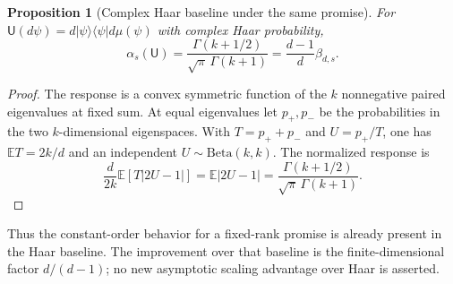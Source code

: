 \documentclass[11pt]{article}
\newtheorem{proposition}{Proposition}
\begin{document}
\begin{proposition}[Complex Haar baseline under the same promise]
For $\mathsf U(d\psi)=d|\psi\rangle\langle\psi|d\mu(\psi)$
with complex Haar probability,
\[
\alpha_s(\mathsf U)
=\frac{\Gamma(k+1/2)}{\sqrt\pi\,\Gamma(k+1)}
=\frac{d-1}{d}\beta_{d,s}.
\]
\end{proposition}
\begin{proof}
The response is a convex symmetric function of the $k$ nonnegative
paired eigenvalues at fixed sum. At equal eigenvalues let $p_+,p_-$
be the probabilities in the two $k$-dimensional eigenspaces.
With $T=p_++p_-$ and $U=p_+/T$, one has
$\mathbb ET=2k/d$ and an independent $U\sim\mathrm{Beta}(k,k)$.
The normalized response is
\[
\frac{d}{2k}\mathbb E[T|2U-1|]
=\mathbb E|2U-1|
=\frac{\Gamma(k+1/2)}{\sqrt\pi\,\Gamma(k+1)}.
\]
\end{proof}
Thus the constant-order behavior for a fixed-rank promise is already
present in the Haar baseline. The improvement over that baseline is
the finite-dimensional factor $d/(d-1)$; no new asymptotic scaling
advantage over Haar is asserted.
\end{document}

